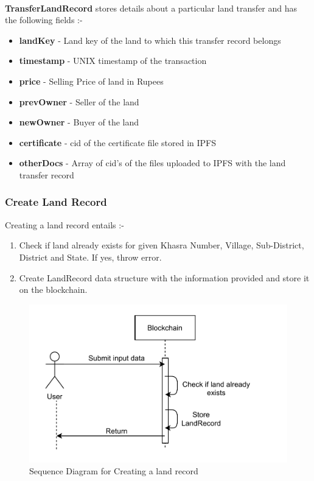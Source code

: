 \documentclass{article}
\begin{document}
        \paragraph{}
        \textbf{TransferLandRecord} stores details about a particular land transfer and has the following fields :-
        \begin{itemize}
            \item \textbf{landKey} - Land key of the land to which this transfer record belongs
            \item \textbf{timestamp} - UNIX timestamp of the transaction
            \item \textbf{price} - Selling Price of land in Rupees
            \item \textbf{prevOwner} - Seller of the land
            \item \textbf{newOwner} - Buyer of the land
            \item \textbf{certificate} - \gls{cid} of the certificate file stored in IPFS
            \item \textbf{otherDocs} - Array of \gls{cid}'s of the files uploaded to IPFS with the land transfer record
        \end{itemize}

    \subsubsection{Create Land Record}
        Creating a land record entails :-
        \begin{enumerate}
            \item Check if land already exists for given Khasra Number, Village, Sub-District, District and State. If yes, throw error.
            \item Create LandRecord data structure with the information provided and store it on the blockchain.
        \end{enumerate}

        \begin{figure}[htbp]
            \includegraphics[scale=0.25]{blockchain_seq_create_land}
            \centering
            \caption{Sequence Diagram for Creating a land record}
        \end{figure}
\end{document}
